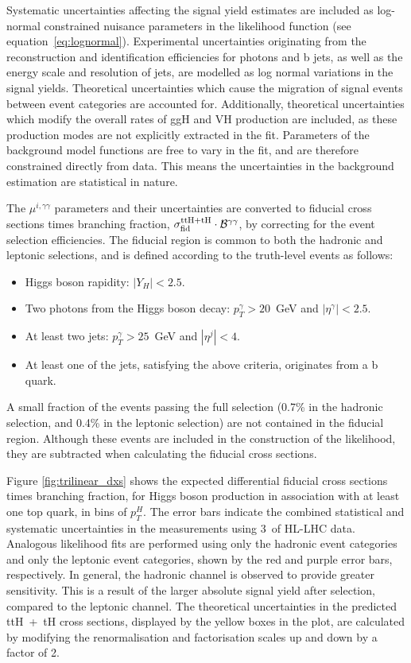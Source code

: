 Systematic uncertainties affecting the signal yield estimates are included as log-normal constrained nuisance parameters in the likelihood function (see equation~\ref{eq:lognormal}). Experimental uncertainties originating from the reconstruction and identification efficiencies for photons and b jets, as well as the energy scale and resolution of jets, are modelled as log normal variations in the signal yields. Theoretical uncertainties which cause the migration of signal events between event categories are accounted for. Additionally, theoretical uncertainties which modify the overall rates of ggH and VH production are included, as these production modes are not explicitly extracted in the fit. Parameters of the background model functions are free to vary in the fit, and are therefore constrained directly from data. This means the uncertainties in the background estimation are statistical in nature.

The $\mu^{i,\gamma\gamma}$ parameters and their uncertainties are converted to fiducial cross sections times branching fraction, $\sigma^{\rm{ttH+tH}}_{\rm{fid}}\cdot\mathcal{B}^{\gamma\gamma}$, by correcting for the event selection efficiencies. The fiducial region is common to both the hadronic and leptonic selections, and is defined according to the truth-level events as follows:
\begin{itemize}
    \item Higgs boson rapidity: $|Y_H|<2.5$.
    \item Two photons from the Higgs boson decay: $p_T^\gamma > 20$~GeV and $|\eta^\gamma|<2.5$.
    \item At least two jets: $p_T^\gamma > 25$~GeV and $|\eta^j|<4$.
    \item At least one of the jets, satisfying the above criteria, originates from a b quark.
\end{itemize}
\noindent
A small fraction of the events passing the full selection (0.7\% in the hadronic selection, and 0.4\% in the leptonic selection) are not contained in the fiducial region. Although these events are included in the construction of the likelihood, they are subtracted when calculating the fiducial cross sections.

Figure \ref{fig:trilinear_dxs} shows the expected differential fiducial cross sections times branching fraction, for Higgs boson production in association with at least one top quark, in bins of $p_T^H$. The error bars indicate the combined statistical and systematic uncertainties in the measurements using 3~\abinv of HL-LHC data. Analogous likelihood fits are performed using only the hadronic event categories and only the leptonic event categories, shown by the red and purple error bars, respectively. In general, the hadronic channel is observed to provide greater sensitivity. This is a result of the larger absolute signal yield after selection, compared to the leptonic channel. The theoretical uncertainties in the predicted ttH~+~tH cross sections, displayed by the yellow boxes in the plot, are calculated by modifying the renormalisation and factorisation scales up and down by a factor of 2.

